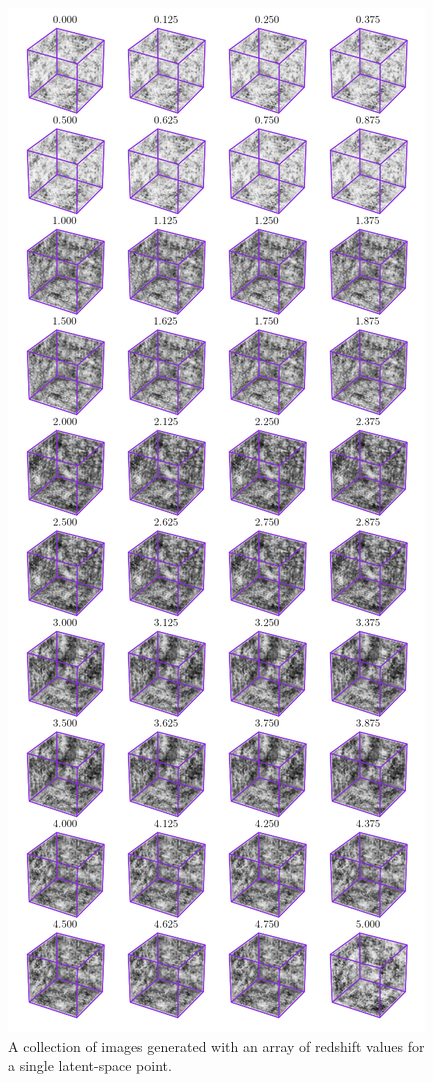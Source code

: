 \documentclass[twocolumn]{article}
\numberwithin{equation}{section}
\begin{document}
\begin{figure}[!ht]%
\includegraphics[width=\columnwidth]{figures/cubes/acgan3d_interp.png}
\centering
\caption{A collection of images generated with an array of redshift values for a single latent-space point.}
\label{fig:acgan_interp}
\end{figure}
\end{document}
